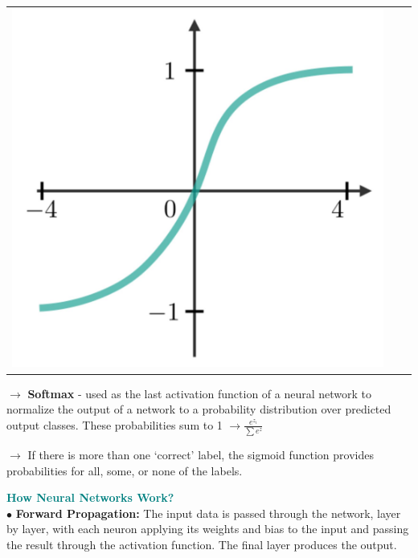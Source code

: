 \documentclass[letterpaper, 10.5pt,landscape]{article}
\begin{document}
\begin{multicols*}{3}
\begin{center}
\begin{tabular}{c|c|c}
         \includegraphics[scale = .047]{figures/tanh.JPG}

\end{tabular}
\end{center}






$\rightarrow$ \textbf{Softmax} - used as the last activation function of a neural network to normalize the output of a network to a probability distribution over predicted output classes. These probabilities sum to 1 $\to \frac{e^{z_i}}{\sum e^{z}}$

$\rightarrow$ If there is more than one `correct' label, the sigmoid function provides probabilities for all, some, or none of the labels.





\vspace{3pt}
\textbf{\textcolor{teal}{How Neural Networks Work?}} \\
$\bullet$  \textbf{Forward Propagation:} The input data is passed through the network, layer by layer, with each neuron applying its weights and bias to the input and passing the result through the activation function. The final layer produces the output.

\vspace{2pt}


\end{multicols*}
\end{document}
